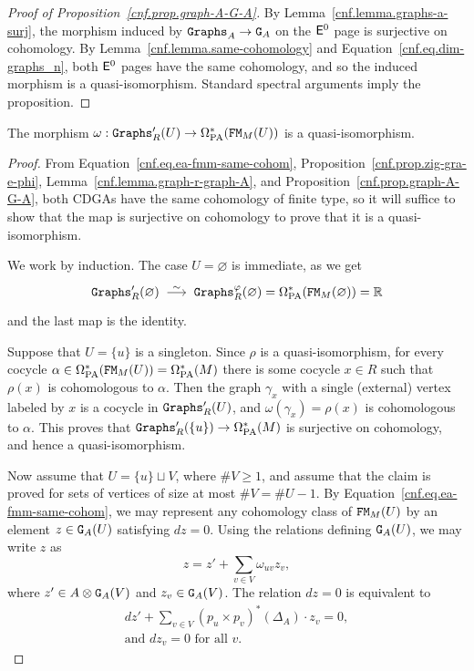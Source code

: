 \begin{proof}[Proof of Proposition~\ref{cnf.prop.graph-A-G-A}]
  By Lemma~\ref{cnf.lemma.graphs-a-surj}, the morphism induced by $\mathtt{Graphs}_{A} \to \mathtt{G}_{A}$ on the $\mathsf{E}^{0}$ page is surjective on cohomology.
  By Lemma~\ref{cnf.lemma.same-cohomology} and Equation~\eqref{cnf.eq.dim-graphs_n}, both $\mathsf{E}^{0}$ pages have the same cohomology, and so the induced morphism is a quasi-isomorphism.
  Standard spectral arguments imply the proposition.
\end{proof}

\begin{proposition}
  \label{cnf.prop.surj-cohom}
  The morphism $\omega : \mathtt{Graphs}'_{R}(U) \to \Omega_{\mathrm{PA}}^{*}(\mathtt{FM}_{M}(U))$ is a quasi-iso\-mor\-phism.
\end{proposition}

\begin{proof}
  From Equation~\eqref{cnf.eq.ea-fmm-same-cohom}, Proposition~\ref{cnf.prop.zig-gra-e-phi}, Lemma~\ref{cnf.lemma.graph-r-graph-A}, and Proposition~\ref{cnf.prop.graph-A-G-A}, both CDGAs have the same cohomology of finite type, so it will suffice to show that the map is surjective on cohomology to prove that it is a quasi-isomorphism.

  We work by induction.
  The case $U = \varnothing$ is immediate, as we get
  \[ \Graphs'_{R}(\varnothing) \qiso \Graphs^{\varphi}_{R}(\varnothing) = \OmPA^{*}(\FM_{M}(\varnothing)) = \R \]
  and the last map is the identity.

  Suppose that $U = \{ u \}$ is a singleton.
  Since $\rho$ is a quasi-isomorphism, for every cocycle $\alpha \in \Omega_{\mathrm{PA}}^{*}(\mathtt{FM}_{M}(U)) = \Omega_{\mathrm{PA}}^{*}(M)$ there is some cocycle $x \in R$ such that $\rho(x)$ is cohomologous to $\alpha$.
  Then the graph $\gamma_{x}$ with a single (external) vertex labeled by $x$ is a cocycle in $\mathtt{Graphs}'_{R}(U)$, and $\omega(\gamma_{x}) = \rho(x)$ is cohomologous to $\alpha$.
  This proves that $\mathtt{Graphs}'_{R}(\{u\}) \to \Omega_{\mathrm{PA}}^{*}(M)$ is surjective on cohomology, and hence a quasi-isomorphism.

  Now assume that $U = \{ u \} \sqcup V$, where $\# V \geq 1$, and assume that the claim is proved for sets of vertices of size at most $\# V = \#U - 1$.
  By Equation~\eqref{cnf.eq.ea-fmm-same-cohom}, we may represent any cohomology class of $\mathtt{FM}_{M}(U)$ by an element $z \in \mathtt{G}_{A}(U)$ satisfying $dz = 0$.
  Using the relations defining $\mathtt{G}_{A}(U)$, we may write $z$ as
  \[ z = z' + \sum_{v \in V} \omega_{uv} z_{v}, \]
  where $z' \in A \otimes \mathtt{G}_{A}(V)$ and $z_{v} \in \mathtt{G}_{A}(V)$.
  The relation $dz = 0$ is equivalent to
  \begin{align}
    dz' + \sum_{v \in V} (p_{u} \times p_{v})^{*}(\Delta_{A}) \cdot z_{v} = 0, \label{cnf.eq.some-label} \\
    \text{and } dz_{v} = 0 \text{ for all } v.
  \end{align}


\end{proof}
